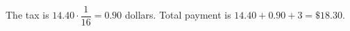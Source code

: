 The tax is $14.40\cdot\dfrac{1}{16}=0.90$ dollars. Total payment is $14.40+0.90+3=\boxed{\$18.30}$.
